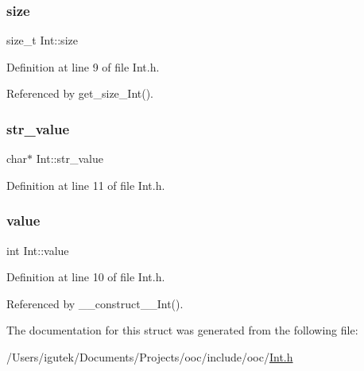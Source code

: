 \subsubsection{\texorpdfstring{size}{size}}
{\footnotesize\ttfamily size\+\_\+t Int\+::size}



Definition at line 9 of file Int.\+h.



Referenced by get\+\_\+size\+\_\+\+Int().

\mbox{\label{structInt_aedf38abd9d2da54ad7b8889b97024d9c}} 
\subsubsection{\texorpdfstring{str\+\_\+value}{str\_value}}
{\footnotesize\ttfamily char$\ast$ Int\+::str\+\_\+value}



Definition at line 11 of file Int.\+h.

\mbox{\label{structInt_ab131a0721b22e28accfb39f0195413ab}} 
\subsubsection{\texorpdfstring{value}{value}}
{\footnotesize\ttfamily int Int\+::value}



Definition at line 10 of file Int.\+h.



Referenced by \+\_\+\+\_\+construct\+\_\+\+\_\+\+Int().



The documentation for this struct was generated from the following file\+:\begin{DoxyCompactItemize}
\item 
/\+Users/igutek/\+Documents/\+Projects/ooc/include/ooc/\mbox{\hyperlink{Int_8h}{Int.\+h}}\end{DoxyCompactItemize}

